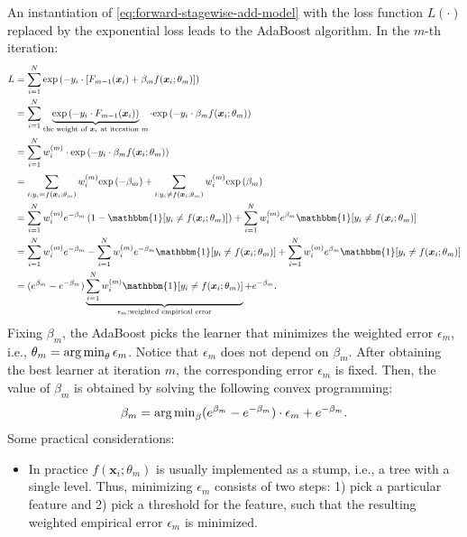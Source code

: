 {    
         An instantiation of \eqref{eq:forward-stagewise-add-model} with the loss function $L(\cdot)$ replaced by the exponential loss leads to the AdaBoost algorithm.
        In the $m$-th iteration:
            \begin{equation}
                \begin{aligned}
                    L & = \sum_{i=1}^{\ndata}{ \EXP{ - y_i \cdot \left[F_{m-1}(\bm{x}_i) + \beta_m f(\bm{x}_i; \theta_m) \right] } }\\
                      & = \sum_{i=1}^{\ndata}{\underbrace{\EXP{-y_i \cdot F_{m-1}(\bm{x}_i)}}_{\text{the weight of $\bm{x}_i$ at iteration $m$}} \cdot \EXP{-y_i \cdot \beta_m f(\bm{x}_i; \theta_m)} }\\
                      & = \sum_{i=1}^{\ndata}{w_i^{(m)} \cdot \EXP{-y_i \cdot \beta_m f(\bm{x}_i; \theta_m)}} \\
                      & = \sum_{i:y_i = f(\bm{x}_i;\theta_m)}^{}{w_i^{(m)} \EXP{-\beta_m}} + \sum_{i:y_i \ne f(\bm{x}_i;\theta_m)}^{}{w_i^{(m)} \EXP{\beta_m}} \\
                      & = \sum_{i=1}^{\ndata}{w^{(m)}_i e^{-\beta_m} \left( 1- \mathbbm{1}[y_i \ne f(\bm{x}_i; \theta_m)] \right)} + \sum_{i=1}^{\ndata}{w^{(m)}_i e^{\beta_m} \mathbbm{1}[y_i \ne f(\bm{x}_i; \theta_m)]} \\
                      & = \sum_{i=1}^{\ndata}{w^{(m)}_i e^{-\beta_m}} - \sum_{i=1}^{\ndata}{w^{(m)}_i e^{-\beta_m} \mathbbm{1}[y_i \ne f(\bm{x}_i; \theta_m)]} + \sum_{i=1}^{\ndata}{w^{(m)}_i e^{\beta_m} \mathbbm{1}[y_i \ne f(\bm{x}_i; \theta_m)]} \\
                      & = (e^{\beta_m} - e^{-\beta_m}) \underbrace{\sum_{i=1}^{\ndata}{w^{(m)}_i \mathbbm{1}[y_i \ne f(\bm{x}_i; \theta_m)]}}_{\epsilon_m: \text{weighted empirical error}} + e^{-\beta_m}.
                \end{aligned}
            \end{equation}
        Fixing $\beta_m$, the AdaBoost picks the learner that minimizes the weighted error $\epsilon_m$, i.e., $\theta_m = \operatorname{arg\,min}_{\theta} \epsilon_m$.
        Notice that $\epsilon_m$ does not depend on $\beta_m$.
        After obtaining the best learner at iteration $m$, the corresponding error $\epsilon_m$ is fixed.
        Then, the value of $\beta_m$ is obtained by solving the following convex programming:
        \begin{equation}
            \beta_m = \operatorname{arg\,min}_{\beta} (e^{\beta_m} - e^{-\beta_m}) \cdot \epsilon_m + e^{-\beta_m}.
        \end{equation}
         Some practical considerations:
        \begin{itemize}
            \item In practice $f(\bm{x}_i; \theta_m)$ is usually implemented as a stump, i.e., a tree with a single level.
            Thus, minimizing $\epsilon_m$ consists of two steps: 1) pick a particular feature and 2) pick a threshold for the feature, such that the resulting weighted empirical error $\epsilon_m$ is minimized.
        \end{itemize}
        
}
